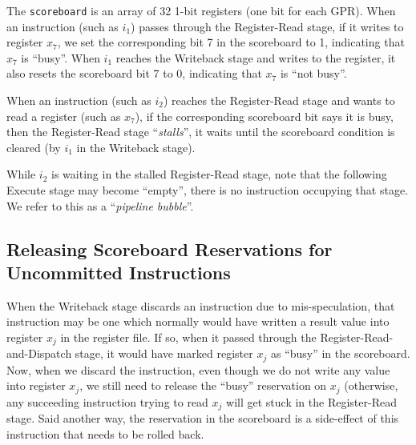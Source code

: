 The \verb|scoreboard| is an array of 32 1-bit registers (one bit for
each GPR).  When an instruction (such as $i_1$) passes through the
Register-Read stage, if it writes to register $x_7$, we set the
corresponding bit 7 in the scoreboard to 1, indicating that $x_7$ is
``busy''.  When $i_1$ reaches the Writeback stage and writes to the
register, it also resets the scoreboard bit 7 to 0, indicating that
$x_7$ is ``not busy''.

When an instruction (such as $i_2$) reaches the Register-Read stage
and wants to read a register (such as $x_7$), if the corresponding
scoreboard bit says it is busy, then the Register-Read stage
``\emph{stalls}'', {\ie} it waits until the scoreboard condition is
cleared (by $i_1$ in the Writeback stage).


While $i_2$ is waiting in the stalled Register-Read stage, note that
the following Execute stage may become ``empty'', {\ie} there is no
instruction occupying that stage.  We refer to this as a
``\emph{pipeline bubble}''.






\subsection{Releasing Scoreboard Reservations for Uncommitted Instructions}

When the Writeback stage discards an instruction due to
mis-speculation, that instruction may be one which normally would have
written a result value into register $x_j$ in the register file.  If
so, when it passed through the Register-Read-and-Dispatch stage, it
would have marked register $x_j$ as ``busy'' in the scoreboard.  Now,
when we discard the instruction, even though we do not write any value
into register $x_j$, we still need to release the ``busy'' reservation
on $x_j$ (otherwise, any succeeding instruction trying to read $x_j$
will get stuck in the Register-Read stage.  Said another way, the
reservation in the scoreboard is a side-effect of this instruction
that needs to be rolled back.

